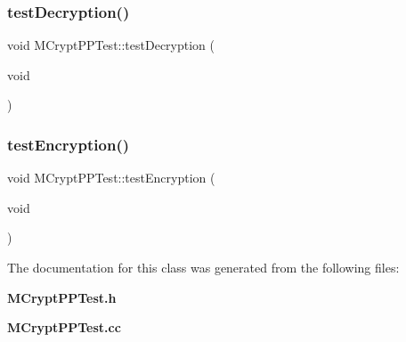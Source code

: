 \subsubsection{test\+Decryption()}
{\footnotesize\ttfamily void M\+Crypt\+P\+P\+Test\+::test\+Decryption (\begin{DoxyParamCaption}\item[{void}]{ }\end{DoxyParamCaption})}

\mbox{\label{classMCryptPPTest_a58ed41baeb9104e94e15a69a29b4ce6e}} 
\subsubsection{test\+Encryption()}
{\footnotesize\ttfamily void M\+Crypt\+P\+P\+Test\+::test\+Encryption (\begin{DoxyParamCaption}\item[{void}]{ }\end{DoxyParamCaption})}



The documentation for this class was generated from the following files\+:\begin{DoxyCompactItemize}
\item 
\textbf{ M\+Crypt\+P\+P\+Test.\+h}\item 
\textbf{ M\+Crypt\+P\+P\+Test.\+cc}\end{DoxyCompactItemize}
